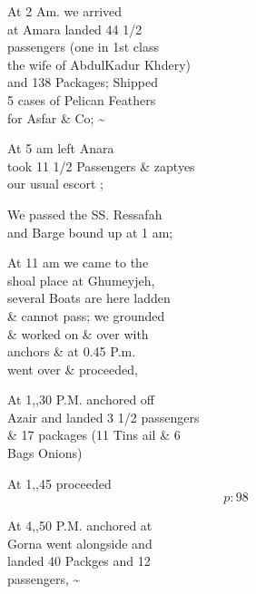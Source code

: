 \documentclass{report}
\begin{document}
	\par{
 	At 2 Am. we arrived\ \\at Amara landed 44 1/2\ \\passengers (one in 1st class\ \\the wife of AbdulKadur Khdery)\ \\and 138 Packages; Shipped\ \\5 cases of Pelican Feathers\ \\for Asfar \& Co; \~{}\ \\
	}

	\par{
 	At 5 am left Anara\ \\took 11 1/2 Passengers \& zaptyes\ \\our usual escort ;\ \\
	}

	\par{
 	We passed the SS. Ressafah\ \\and Barge bound up at 1 am;\ \\
	}

	\par{
 	At 11 am we came to the\ \\shoal place at Ghumeyjeh,\ \\several Boats are here ladden\ \\\& cannot pass; we grounded\ \\\& worked on \& over with\ \\anchors \& at 0.45 P.m.\ \\went over \& proceeded,\ \\
	}

	\par{
 	At 1,,30 P.M. anchored off\ \\Azair and landed 3 1/2 passengers\ \\\& 17 packages (11 Tins ail \& 6\ \\Bags Onions)\ \\
	}

	\par{
 	At 1,,45 proceeded\ \\
  \[p: 98 \]

	}

	\par{
 	At 4,,50 P.M. anchored at\ \\Gorna went alongside and\ \\landed 40 Packges and 12\ \\passengers, \~{}\ \\
	}
\end{document}
